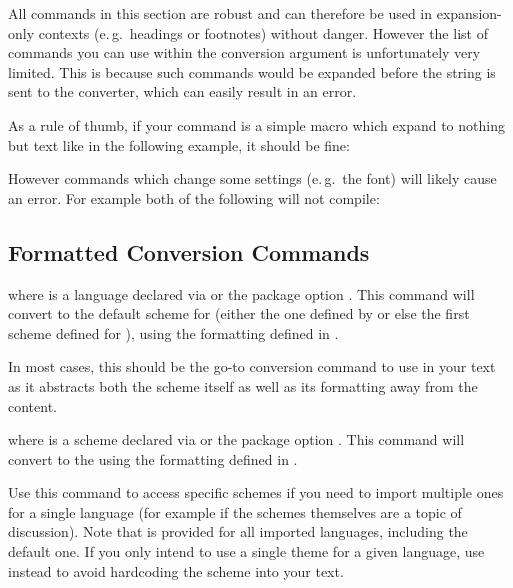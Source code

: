 \documentclass{ltxdockit}
\begin{document}
All commands in this section are robust and can therefore be used in
expansion-only contexts (e.\,g.\ headings or footnotes) without danger. However
the list of commands you can use within the conversion argument is unfortunately
very limited. This is because such commands would be expanded before the string
is sent to the converter, which can easily result in an error.

As a rule of thumb, if your command is a simple macro which expand to nothing
but text like in the following example, it should be fine:

\begin{ltxcode}
  \newcommand\mystring{Zhe4 mei2you3 wen4ti2.}
  \topinyin{\mystring}
\end{ltxcode}

However commands which change some settings (e.\,g.\ the font) will likely
cause an error. For example both of the following will not compile:

\begin{ltxcode}
\end{ltxcode}

\noindent

\subsection{Formatted Conversion Commands}

\begin{ltxsyntax}

  where  is a language declared via
   or the package option .
  This command will convert  to the default scheme for 
  (either the one defined by  or else the first scheme
  defined for ), using the formatting defined in
  .

  In most cases, this should be the go-to conversion command to use in your text
  as it abstracts both the scheme itself as well as its formatting away from the
  content.


  where  is a scheme declared via
   or the package option .
  This command will convert  to the  using the formatting
  defined in .

  Use this command to access specific schemes if you need to import multiple
  ones for a single language (for example if the schemes themselves are a topic
  of discussion). Note that  is provided for all
  imported languages, including the default one. If you only intend to use a
  single theme for a given language, use  instead to
  avoid hardcoding the scheme into your text.

\end{ltxsyntax}
\end{document}

